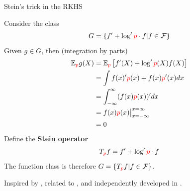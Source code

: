 \begin{frame}
\begin{columns}
\begin{column}{.33\linewidth}
\begin{block}{Stein's trick in the RKHS}

Consider the  class \large
$$G = \{ f'  +  \log' { \color{red} p} \cdot  f | f \in \mathcal{F} \}$$
\normalsize
Given $g\in G$, then (integration by parts)
\begin{align*}
\mathbb{E}_{\color{red} p} g(X) &=
\mathbb{E}_{\color{red} p} \left[ f'(X)  +  \log' {\color{red} p}(X) f(X) \right] \\
&= \int   f(x)' { \color{red} p}(x)   + f(x){\color{red} p}'(x) dx \\
&= \int_{-\infty}^{\infty} (f(x) {\color{red} p}(x) )'  dx \\
&= f(x) {\color{red} p}(x)  \big|_{x=-\infty}^{x=\infty} \\
&= 0
\end{align*}
Define the {\bf Stein operator}
\[
 T_{\color{red} p}f =  f'  +  \log' { \color{red} p} \cdot  f
\]
The function class is therefore $G = \{ T_{\color{red} p}f | f \in \mathcal{F} \}$.

Inspired by \cite{gorham2015measuring}, related to \cite{OatGirCho15}, and independently developed in \cite{LiuLeeJor16_icml}.
\end{block} %
\vspace{-0.75cm}



\end{column}
\end{columns}
\end{frame}
